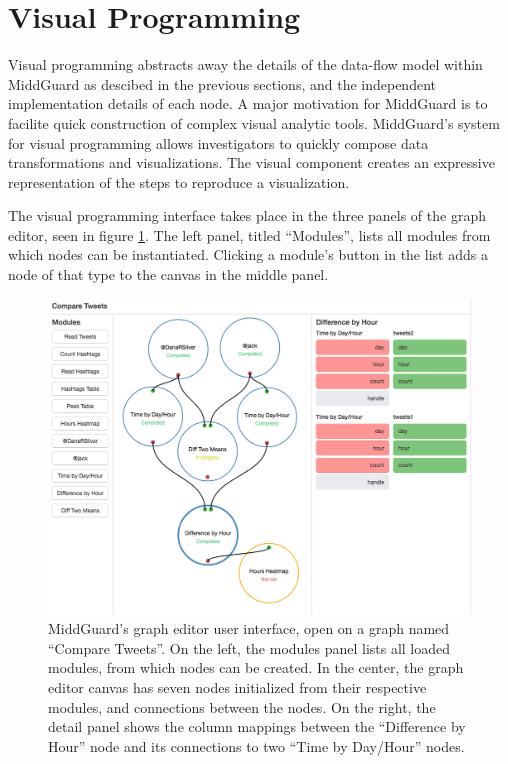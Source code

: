 \documentclass[midd]{thesis}
\begin{document}
\section{Visual Programming}

Visual programming abstracts away the details of the data-flow model within
MiddGuard as descibed in the previous sections, and the independent
implementation details of each node. A major motivation for MiddGuard is to
facilite quick construction of complex visual analytic tools. MiddGuard's system
for visual programming allows investigators to quickly compose data
transformations and visualizations. The visual component creates an expressive
representation of the steps to reproduce a visualization.

The visual programming interface takes place in the three panels of the graph
editor, seen in figure \ref{fig:grapheditor}. The left panel, titled
``Modules'', lists all modules from which nodes can be instantiated. Clicking a
module's button in the list adds a node of that type to the canvas in the middle
panel.

\begin{figure}[!ht]
  \centering
  \includegraphics[width=1\textwidth]{compare-tweets-graph-editor-no-sidebar}
  \caption{MiddGuard's graph editor user interface, open on a graph named
  ``Compare Tweets''. On the left, the modules panel lists all loaded modules,
  from which nodes can be created. In the center, the graph editor canvas has
  seven nodes initialized from their respective modules, and connections between
  the nodes. On the right, the detail panel shows the column mappings between
  the ``Difference by Hour'' node and its connections to two
  ``Time by Day/Hour'' nodes.}
  \label{fig:grapheditor}
\end{figure}
\end{document}
